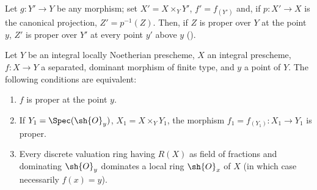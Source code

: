 Let $g:Y'\to Y$ be any morphism; set $X'=X\times_Y Y'$, $f'=f_{(Y')}$ and, if $p:X'\to X$ is the canonical projection, $Z'=p^{-1}(Z)$.
Then, if $Z$ is proper over $Y$ at the point $y$, $Z'$ is proper over $Y'$ at every point $y'$ above $y$ ().

\begin{proposition}[15.7.2]
\label{IV.15.7.2}
Let $Y$ be an integral locally Noetherian prescheme, $X$ an integral prescheme, $f:X\to Y$ a separated, dominant morphism of finite type, and $y$ a point of $Y$.
The following conditions are equivalent:
\begin{enumerate}[label=\emph{\alph*)}]
  \item $f$ is proper at the point $y$.
  \item If $Y_1=\Spec(\sh{O}_y)$, $X_1=X\times_Y Y_1$, the morphism $f_1=f_{(Y_1)}:X_1\to Y_1$ is proper.
  \item Every discrete valuation ring having $R(X)$ as field of fractions and dominating $\sh{O}_y$ dominates a local ring $\sh{O}_x$ of $X$ (in which case necessarily $f(x)=y$).
\end{enumerate}
\end{proposition}

